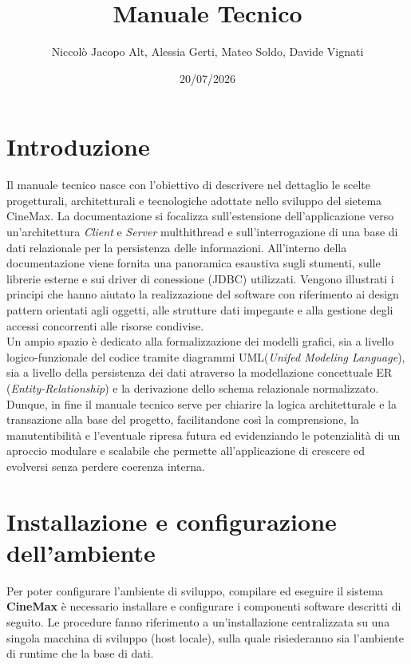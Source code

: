 \documentclass{article}
\title{Manuale Tecnico}
\author{Niccolò Jacopo Alt, Alessia Gerti, Mateo Soldo, Davide Vignati}
\date{20/07/2026}
\begin{document}
\newpage

\maketitle
\newpage
\tableofcontents
\newpage
\maketitle

\section{Introduzione}
Il manuale tecnico nasce con l'obiettivo di descrivere nel dettaglio le scelte progetturali, architetturali e tecnologiche adottate nello sviluppo del sietema CineMax. 
La documentazione si focalizza sull'estensione dell'applicazione verso un'architettura \textit{Client} e \textit{Server} multhithread e sull'interrogazione di una base di dati relazionale per la persistenza delle informazioni. 
All'interno della documentazione viene fornita una panoramica esaustiva sugli stumenti, sulle librerie esterne e sui driver di conessione (JDBC) utilizzati. Vengono illustrati i principi che hanno aiutato la realizzazione del software con riferimento ai design pattern orientati agli oggetti, alle strutture dati impegante e alla gestione degli accessi concorrenti alle risorse condivise.\\
Un ampio spazio è dedicato alla formalizzazione dei modelli grafici, sia a livello logico-funzionale del codice tramite diagrammi UML(\textit{Unifed Modeling Language}), sia a livello della persistenza dei dati atraverso la modellazione concettuale ER (\textit{Entity-Relationship}) e la derivazione dello schema relazionale normalizzato. 
Dunque, in fine il manuale tecnico serve per chiarire la logica architetturale e la transazione alla base del progetto, facilitandone così la comprensione, la manutentibilità e l'eventuale ripresa futura ed evidenziando le potenzialità di un aproccio modulare e scalabile che permette all'applicazione di crescere ed evolversi senza perdere coerenza interna.


\section{Installazione e configurazione dell'ambiente}
Per poter configurare l'ambiente di sviluppo, compilare ed eseguire il sistema \textbf{CineMax} è necessario installare e configurare i componenti software descritti di seguito. Le procedure fanno riferimento a un'installazione centralizzata su una singola macchina di sviluppo (host locale), sulla quale risiederanno sia l'ambiente di runtime che la base di dati.
\end{document}
